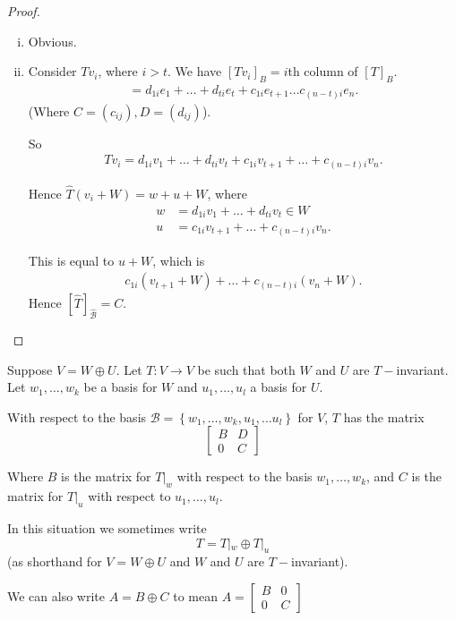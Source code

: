 \documentclass{article}
\theoremstyle{definition} \newtheorem*{definition}{Definition}
\begin{document}
 \begin{proof}\hfill
   \begin{enumerate}[(i)]
     \item Obvious.
     \item Consider $Tv_i$, where $i>t$. We have 
       $[Tv_i]_B=i$th column of $[T]_B$.
       \begin{align*}
         = d_{1i}e_1 + \dots + d_{ti}e_t + c_{1i}e_{t+1} \dots 
         c_{(n-t) i}e_n.
       \end{align*}
       (Where $C = (c_{ij}), D = (d_{ij}) $).

       So 
       \begin{align*}
         Tv_i = d_{1i}v_1 + \dots + d_{ti} v_t + c_{1i} v_{t+1} + \dots 
         + c_{(n-t) i}v_n.
       \end{align*}

       Hence $\hat{T}(v_i + W)=w + u + W$, where
       \begin{align*}
         w &= d_{1i}v_1 + \dots + d_{ti} v_t \in W \\
         u &= c_{1i}v_{t+1} + \dots + c_{(n-t) i }v_n.
       \end{align*}

       This is equal to $u + W$, which is
       \begin{align*}
         c_{1i}(v_{t+1} + W) + \dots + c_{(n-t) i } (v_n + W).
       \end{align*}
       Hence $[\hat{T}]_{\hat{\mathcal{B}}}=C$.

   \end{enumerate}
 \end{proof}

 \begin{remark}
   Suppose $V = W \oplus U$. Let $T:V\rightarrow V$ be such that both
   $W$ and $U$ are $T-$invariant. Let $w_1,\dots, w_k$ be a basis for
   $W$ and $u_1, \dots , u_l$ a basis for $U$. 

   With respect to the basis $\mathcal{B} = \left\{ w_1, \dots , w_k, u_1,
   \dots u_l \right\}$ for $V$, $T$ has the matrix 
   \[
      \begin{bmatrix}
        B & D \\
        0 & C
      \end{bmatrix}
   \]

   Where $B$ is the matrix for $T|_w$ with respect to the basis
   $w_1, \dots, w_k$, and $C$ is the matrix for $T|_u$ with 
   respect to $u_1, \dots, u_l$.

   In this situation we sometimes write
   \[
     T = T|_w \oplus T|_u
   \]
   (as shorthand for $V  = W \oplus U$ and $W$ and $U$ are $T-$invariant).

   We can also write $A = B \oplus C$ to mean $A = 
      \begin{bmatrix}
        B & 0 \\
        0 & C
      \end{bmatrix}
   $
 \end{remark}
\end{document}

